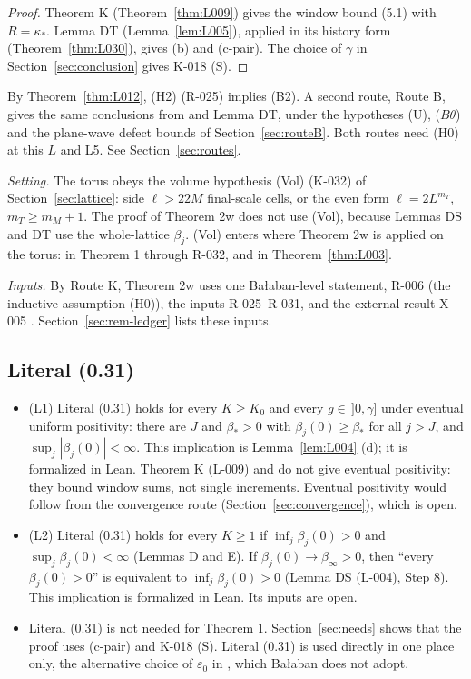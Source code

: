 \begin{proof}
Theorem K (Theorem~\ref{thm:L009}) gives the window bound (5.1) with $R=\kappa_*$. Lemma DT (Lemma~\ref{lem:L005}), applied in its history form (Theorem~\ref{thm:L030}), gives (b) and (c-pair). The choice of $\gamma$ in Section~\ref{sec:conclusion} gives K-018 (S).
\end{proof}

By Theorem~\ref{thm:L012}, (H2) (R-025) implies (B2). A second route, Route B, gives the same conclusions from \ThmPW{} and Lemma DT, under the hypotheses (U), ($B\theta$) and the plane-wave defect bounds of Section~\ref{sec:routeB}. Both routes need (H0) at this $L$ and L5. See Section~\ref{sec:routes}.

\emph{Setting.} The torus obeys the volume hypothesis (Vol) (K-032) of Section~\ref{sec:lattice}: side $\ell>22M$ final-scale cells, or the even form $\ell=2L^{m_T}$, $m_T\ge m_M+1$. The proof of Theorem 2w does not use (Vol), because Lemmas DS and DT use the whole-lattice $\beta_j$. (Vol) enters where Theorem 2w is applied on the torus: in Theorem 1 through R-032, and in Theorem~\ref{thm:L003}.

\emph{Inputs.} By Route K, Theorem 2w uses one Ba{\l}aban-level statement, R-006 (the inductive assumption (H0)), the inputs R-025--R-031, and the external result X-005 \cite{Savvidy2019}. Section~\ref{sec:rem-ledger} lists these inputs.

\subsection{Literal (0.31)}\label{sec:literal}

\begin{itemize}
\item (L1) Literal (0.31) holds for every $K\ge K_0$ and every $g\in\,]0,\gamma]$ under eventual uniform positivity: there are $J$ and $\beta_*>0$ with $\beta_j(0)\ge\beta_*$ for all $j>J$, and $\sup_j|\beta_j(0)|<\infty$. This implication is Lemma~\ref{lem:L004} (d); it is formalized in Lean. Theorem K (L-009) and \ThmPW{} do not give eventual positivity: they bound window sums, not single increments. Eventual positivity would follow from the convergence route (Section~\ref{sec:convergence}), which is open.
\item (L2) Literal (0.31) holds for every $K\ge 1$ if $\inf_j\beta_j(0)>0$ and $\sup_j\beta_j(0)<\infty$ (Lemmas D and E). If $\beta_j(0)\to\beta_\infty>0$, then ``every $\beta_j(0)>0$'' is equivalent to $\inf_j\beta_j(0)>0$ (Lemma DS (L-004), Step 8). This implication is formalized in Lean. Its inputs are open.
\item Literal (0.31) is not needed for Theorem 1. Section~\ref{sec:needs} shows that the proof uses (c-pair) and K-018 (S). Literal (0.31) is used directly in one place only, the alternative choice of $\varepsilon_0$ in \cite[p.~248]{balaban119}, which Ba{\l}aban does not adopt.
\end{itemize}

